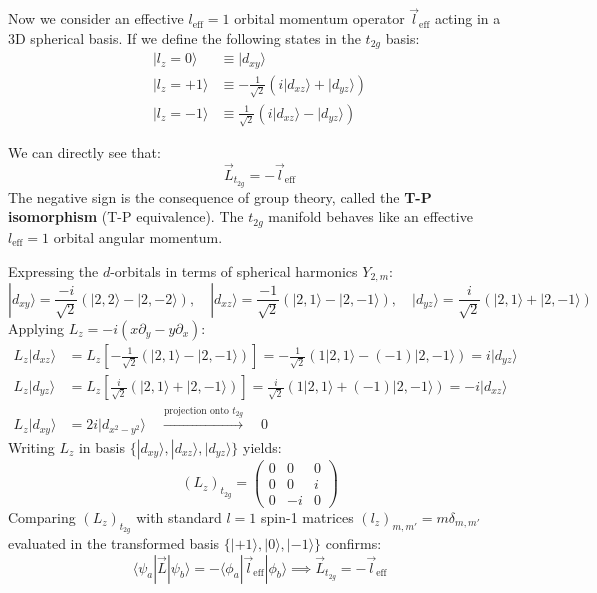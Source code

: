 \documentclass[11pt,a4paper]{article}
\begin{document}
Now we consider an effective $l_{\text{eff}} = 1$ orbital momentum operator $\vec{l}_{\text{eff}}$ acting in a 3D spherical basis. If we define the following states in the $t_{2g}$ basis:
\begin{align}
    |l_z = 0\rangle &\equiv |d_{xy}\rangle \\
    |l_z = +1\rangle &\equiv -\frac{1}{\sqrt{2}} \left( i|d_{xz}\rangle + |d_{yz}\rangle \right) \\
    |l_z = -1\rangle &\equiv \frac{1}{\sqrt{2}} \left( i|d_{xz}\rangle - |d_{yz}\rangle \right)
\end{align}

We can directly see that:
\begin{equation}
    \vec{L}_{t_{2g}} = -\vec{l}_{\text{eff}}
\end{equation}
The negative sign is the consequence of group theory, called the \textbf{T-P isomorphism} (T-P equivalence). The $t_{2g}$ manifold behaves like an effective $l_{\text{eff}} = 1$ orbital angular momentum.

\begin{proofstep}
    Expressing the $d$-orbitals in terms of spherical harmonics $Y_{2,m}$:
    \begin{equation}
        |d_{xy}\rangle = \frac{-i}{\sqrt{2}}(|2,2\rangle - |2,-2\rangle), \quad 
        |d_{xz}\rangle = \frac{-1}{\sqrt{2}}(|2,1\rangle - |2,-1\rangle), \quad 
        |d_{yz}\rangle = \frac{i}{\sqrt{2}}(|2,1\rangle + |2,-1\rangle)
    \end{equation}
    Applying $L_z = -i(x\partial_y - y\partial_x)$:
    \begin{align}
        L_z |d_{xz}\rangle &= L_z \left[ -\frac{1}{\sqrt{2}}(|2,1\rangle - |2,-1\rangle) \right] = -\frac{1}{\sqrt{2}}(1|2,1\rangle - (-1)|2,-1\rangle) = i |d_{yz}\rangle \\
        L_z |d_{yz}\rangle &= L_z \left[ \frac{i}{\sqrt{2}}(|2,1\rangle + |2,-1\rangle) \right] = \frac{i}{\sqrt{2}}(1|2,1\rangle + (-1)|2,-1\rangle) = -i |d_{xz}\rangle \\
        L_z |d_{xy}\rangle &= 2 i |d_{x^2-y^2}\rangle \quad \xrightarrow{\text{projection onto } t_{2g}} \quad 0
    \end{align}
    Writing $L_z$ in basis $\{|d_{xy}\rangle, |d_{xz}\rangle, |d_{yz}\rangle\}$ yields:
    \begin{equation}
        (L_z)_{t_{2g}} = \begin{pmatrix} 0 & 0 & 0 \\ 0 & 0 & i \\ 0 & -i & 0 \end{pmatrix}
    \end{equation}
    Comparing $(L_z)_{t_{2g}}$ with standard $l=1$ spin-1 matrices $(l_z)_{m, m'} = m \delta_{m, m'}$ evaluated in the transformed basis $\{|+1\rangle, |0\rangle, |-1\rangle\}$ confirms:
    \begin{equation}
        \langle \psi_a | \vec{L} | \psi_b \rangle = - \langle \phi_a | \vec{l}_{\text{eff}} | \phi_b \rangle \implies \vec{L}_{t_{2g}} = -\vec{l}_{\text{eff}}
    \end{equation}
\end{proofstep}
\end{document}
